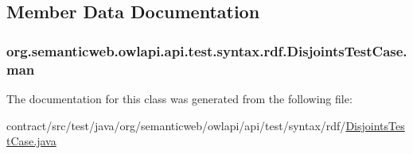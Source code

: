 \subsection{Member Data Documentation}
\hypertarget{classorg_1_1semanticweb_1_1owlapi_1_1api_1_1test_1_1syntax_1_1rdf_1_1_disjoints_test_case_adb81bc21db5fa4aa99ff37b6d3a6dc7f}{
\subsubsection[{man}]{ org.\-semanticweb.\-owlapi.\-api.\-test.\-syntax.\-rdf.\-Disjoints\-Test\-Case.\-man\hspace{0.3cm}{\ttfamily [private]}}}\label{classorg_1_1semanticweb_1_1owlapi_1_1api_1_1test_1_1syntax_1_1rdf_1_1_disjoints_test_case_adb81bc21db5fa4aa99ff37b6d3a6dc7f}


The documentation for this class was generated from the following file\-:\begin{DoxyCompactItemize}
\item 
contract/src/test/java/org/semanticweb/owlapi/api/test/syntax/rdf/\hyperlink{_disjoints_test_case_8java}{Disjoints\-Test\-Case.\-java}\end{DoxyCompactItemize}
